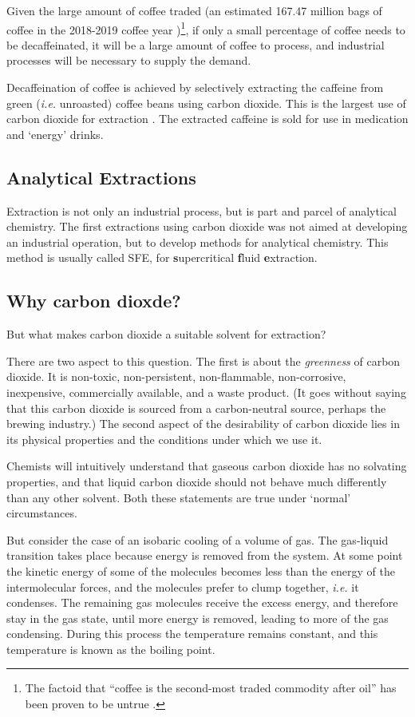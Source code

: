 Given the large amount of coffee traded (an estimated 167.47 million bags of
coffee in the 2018-2019 coffee year \autocite{Coffee2018})\footnote{The factoid
that ``coffee is the second-most traded commodity after oil'' has been proven to
be untrue \autocite{Greenberg2017}.}, if only a small percentage of coffee needs
to be decaffeinated, it will be a large amount of coffee to process, and
industrial processes will be necessary to supply the demand.

Decaffeination of coffee is achieved by selectively extracting the caffeine from
green (\textit{i.e.} unroasted) coffee beans using carbon dioxide. This is the
largest use of carbon dioxide for extraction \autocite{Ramalakshmi1999}. The
extracted caffeine is sold for use in medication and `energy' drinks.

\subsection{Analytical Extractions}

Extraction is not only an industrial process, but is part and parcel of analytical
chemistry. The first extractions using carbon dioxide was not aimed at developing
an industrial operation, but to develop methods for analytical chemistry. This
method is usually called SFE, for \textbf{s}upercritical \textbf{f}luid
\textbf{e}xtraction.

\subsection{Why carbon dioxde?}

But what makes carbon dioxide a suitable solvent for extraction?

There are two aspect to this question. The first is about the \textit{greenness}
of carbon dioxide. It is non-toxic, non-persistent, non-flammable,
non-corrosive, inexpensive, commercially available, and a waste product. (It
goes without saying that this carbon dioxide is sourced from a carbon-neutral
source, perhaps the brewing industry.) The second aspect of the desirability of
carbon dioxide lies in its physical properties and the conditions under which we
use it.

Chemists will intuitively understand that gaseous carbon dioxide has no solvating
properties, and that liquid carbon dioxide should not behave much differently
than any other solvent. Both these statements are true under `normal' circumstances.

But consider the case of an isobaric cooling of a volume of gas. The gas-liquid
transition takes place because energy is removed from the system. At some point
the kinetic energy of some of the molecules becomes less than the energy of the
intermolecular forces, and the molecules prefer to clump together, \textit{i.e.}
it condenses. The remaining gas molecules receive the excess energy, and
therefore stay in the gas state, until more energy is removed, leading to more
of the gas condensing. During this process the temperature remains constant, and
this temperature is known as the boiling point.

